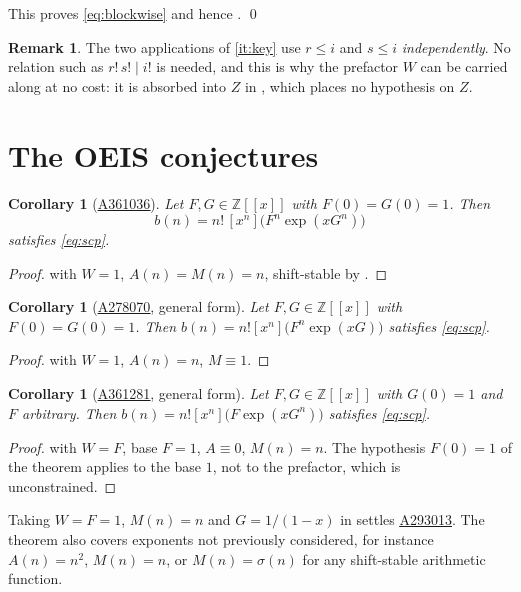 \documentclass[11pt,a4paper]{article}
\theoremstyle{plain}
\newtheorem{corollary}[theorem]{Corollary}
\theoremstyle{definition}
\newtheorem{remark}[theorem]{Remark}
\newcommand{\Z}{\mathbb{Z}}
\newcommand{\coeff}[1]{[x^{#1}]}
\newcommand{\oeis}[1]{\href{https://oeis.org/#1}{\underline{#1}}}
\begin{document}
This proves \eqref{eq:blockwise} and hence . \qed

\begin{remark}
The two applications of \ref{it:key} use $r\le i$ and $s\le i$
\emph{independently}. No relation such as $r!\,s!\mid i!$ is needed, and this is why the
prefactor $W$ can be carried along at no cost: it is absorbed into $Z$ in
, which places no hypothesis on $Z$.
\end{remark}

\section{The OEIS conjectures}\label{sec:cor}

\begin{corollary}[\oeis{A361036}]\label{cor:A361036}
Let $F,G\in\Z[[x]]$ with $F(0)=G(0)=1$. Then
\[
  b(n)=n!\,\coeff{n}\big(F^{n}\exp(xG^{n})\big)
\]
satisfies \eqref{eq:scp}.
\end{corollary}
\begin{proof}
 with $W=1$, $A(n)=M(n)=n$, shift-stable by .
\end{proof}

\begin{corollary}[\oeis{A278070}, general form]\label{cor:A278070}
Let $F,G\in\Z[[x]]$ with $F(0)=G(0)=1$. Then
$b(n)=n!\coeff{n}\big(F^{n}\exp(xG)\big)$ satisfies \eqref{eq:scp}.
\end{corollary}
\begin{proof}
 with $W=1$, $A(n)=n$, $M\equiv1$.
\end{proof}

\begin{corollary}[\oeis{A361281}, general form]\label{cor:A361281}
Let $F,G\in\Z[[x]]$ with $G(0)=1$ and $F$ arbitrary. Then
$b(n)=n!\coeff{n}\big(F\exp(xG^{n})\big)$ satisfies \eqref{eq:scp}.
\end{corollary}
\begin{proof}
 with $W=F$, base $F=1$, $A\equiv0$, $M(n)=n$. The hypothesis
$F(0)=1$ of the theorem applies to the base $1$, not to the prefactor, which is
unconstrained.
\end{proof}

Taking $W=F=1$, $M(n)=n$ and $G=1/(1-x)$ in  settles \oeis{A293013}. The
theorem also covers exponents not previously considered, for instance $A(n)=n^{2}$,
$M(n)=n$, or $M(n)=\sigma(n)$ for any shift-stable arithmetic function.
\end{document}
